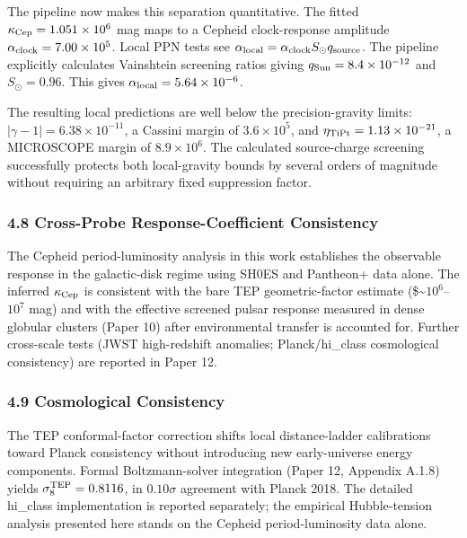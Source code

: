 \documentclass[
]{article}
\begin{document}
The pipeline now makes this separation quantitative. The fitted
\(\kappa_{\rm Cep}=1.051\times10^6\) mag maps to a Cepheid
clock-response amplitude \(\alpha_{\rm clock}=7.00\times10^5\). Local
PPN tests see
\(\alpha_{\rm local}=\alpha_{\rm clock}S_\odot q_{\rm source}\). The
pipeline explicitly calculates Vainshtein screening ratios giving
\(q_{\rm Sun}=8.4\times 10^{-12}\) and \(S_\odot=0.96\). This gives
\(\alpha_{\rm local}=5.64\times 10^{-6}\).

The resulting local predictions are well below the precision-gravity
limits: \(|\gamma-1|=6.38\times10^{-11}\), a Cassini margin of
\(3.6\times10^5\), and \(\eta_{\rm TiPt}=1.13\times10^{-21}\), a
MICROSCOPE margin of \(8.9\times10^6\). The calculated source-charge
screening successfully protects both local-gravity bounds by several
orders of magnitude without requiring an arbitrary fixed suppression
factor.

\subsubsection{4.8 Cross-Probe Response-Coefficient
Consistency}\label{cross-probe-response-coefficient-consistency}

The Cepheid period-luminosity analysis in this work establishes the
observable response in the galactic-disk regime using SH0ES and
Pantheon+ data alone. The inferred \(\kappa_{\rm Cep}\) is consistent
with the bare TEP geometric-factor estimate (\$\sim\(10^6\)--\(10^7\)
mag) and with the effective screened pulsar response measured in dense
globular clusters (Paper 10) after environmental transfer is accounted
for. Further cross-scale tests (JWST high-redshift anomalies;
Planck/hi\_class cosmological consistency) are reported in Paper 12.

\subsubsection{4.9 Cosmological
Consistency}\label{cosmological-consistency}

The TEP conformal-factor correction shifts local distance-ladder
calibrations toward Planck consistency without introducing new
early-universe energy components. Formal Boltzmann-solver integration
(Paper 12, Appendix A.1.8) yields \(\sigma_8^{\rm TEP} = 0.8116\), in
\(0.10\sigma\) agreement with Planck 2018. The detailed hi\_class
implementation is reported separately; the empirical Hubble-tension
analysis presented here stands on the Cepheid period-luminosity data
alone.
\end{document}
